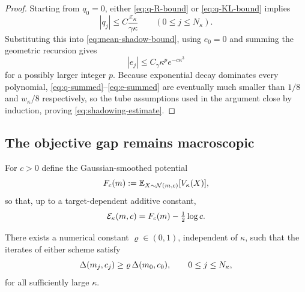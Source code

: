 \begin{proof}
    Starting from $q_0=0$, either \eqref{eq:q-R-bound} or \eqref{eq:q-KL-bound} implies
    \begin{equation}\label{eq:q-summed}
        |q_j|\leq C\frac{\varepsilon_\kappa}{\gamma\kappa}
        \qquad(0\leq j\leq N_\kappa).
    \end{equation}
    Substituting this into \eqref{eq:mean-shadow-bound}, using $e_0=0$ and summing the
    geometric recursion gives
    \begin{equation}\label{eq:e-summed}
        |e_j|\leq C_\gamma\kappa^pe^{-c\kappa^3}
    \end{equation}
    for a possibly larger integer $p$. Because exponential decay dominates every polynomial,
    \eqref{eq:q-summed}--\eqref{eq:e-summed} are eventually much smaller than $1/8$ and
    $w_\kappa/8$ respectively, so the tube assumptions used in the argument close by induction,
    proving \eqref{eq:shadowing-estimate}.
\end{proof}

\subsection{The objective gap remains macroscopic}

For $c>0$ define the Gaussian-smoothed potential
\begin{equation}\label{eq:Fc}
    F_c(m):=\mathbb{E}_{X\sim\mathcal{N}(m,c)}[V_\kappa(X)],
\end{equation}
so that, up to a target-dependent additive constant,
\begin{equation}\label{eq:scalar-objective}
    \mathcal{E}_\kappa(m,c)=F_c(m)-\tfrac12\log c .
\end{equation}

\begin{lemma}\label{lem:bump-gap}
    There exists a numerical constant $\varrho\in(0,1)$, independent of $\kappa$, such that the
    iterates of either scheme satisfy
    \begin{equation}\label{eq:disc-gap-lower-all}
        \Delta(m_j,c_j)\geq\varrho\,\Delta(m_0,c_0),
        \qquad
        0\leq j\leq N_\kappa,
    \end{equation}
    for all sufficiently large $\kappa$.
\end{lemma}

